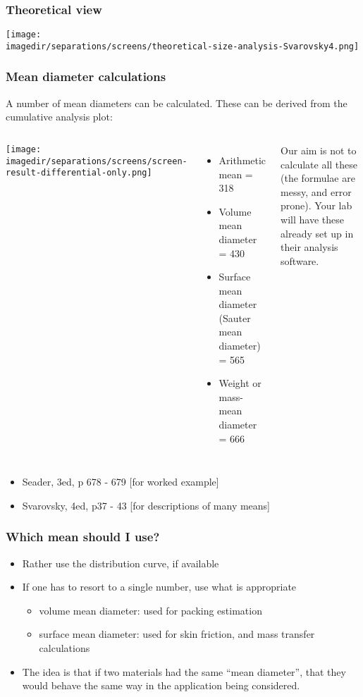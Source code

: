 \begin{frame}\frametitle{Theoretical view}
	\begin{center}
		\texttt{[image: \\imagedir/separations/screens/theoretical-size-analysis-Svarovsky4.png]}
	\end{center}
	\vfill
\end{frame}

\begin{frame}\frametitle{Mean diameter calculations}
	A number of mean diameters can be calculated. These can be derived from the cumulative analysis plot:
	\begin{columns}[c]
			\begin{center}
				\texttt{[image: \\imagedir/separations/screens/screen-result-differential-only.png]}
			\end{center}
		\small
			\begin{itemize}
				\item	Arithmetic mean = 318 \micron
				\item	Volume mean diameter = 430 \micron
				\item	Surface mean diameter (Sauter mean diameter) = 565 \micron
				\item	Weight or mass-mean diameter = 666 \micron
			\end{itemize}
			
			\vspace{12pt}
			\footnotesize
			Our aim is not to calculate all these (the formulae are messy, and error prone). Your lab will have these already set up in their analysis software.
	\end{columns}

	\vspace{5pt}
	\tiny
	\begin{itemize}
		\item	Seader, 3ed, p 678 - 679 [for worked example]
		\item	Svarovsky, 4ed, p37 - 43 [for descriptions of many means]
	\end{itemize}
\end{frame}

\begin{frame}\frametitle{Which mean should I use?}
	\begin{itemize}
		\item	Rather use the distribution curve, if available
		\item	If one has to resort to a single number, use what is appropriate
		\begin{itemize}
			\item	volume mean diameter: used for packing estimation
			\item	surface mean diameter: used for skin friction, and mass transfer calculations
		\end{itemize}

		\item	The idea is that if two materials had the same ``mean diameter'', that they would behave the same way in the application being considered.
	\end{itemize}
\end{frame}

